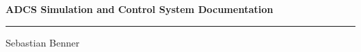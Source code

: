 \begin{titlepage}
	\thispagestyle{empty}
	\centering
	
	\vspace*{8cm}
	
	\begin{minipage}[t]{17cm}
		\centering
		\bfseries\Huge ADCS Simulation and Control System Documentation
	\end{minipage}
	
	\vspace{-0.2cm}
	\rule{17cm}{0.4pt}
	
	\vspace{3cm}
	
	\begin{minipage}[t]{9cm}
		\centering
		Sebastian Benner
	\end{minipage}
	
\end{titlepage}

\restoregeometry